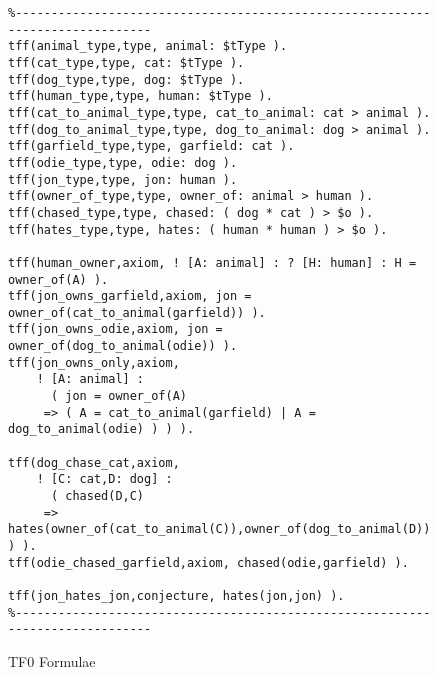 \documentclass{easychair}
\begin{document}
\begin{figure}[htbp]
\begin{small}
\begin{verbatim}
%------------------------------------------------------------------------------
tff(animal_type,type, animal: $tType ).
tff(cat_type,type, cat: $tType ).
tff(dog_type,type, dog: $tType ).
tff(human_type,type, human: $tType ).
tff(cat_to_animal_type,type, cat_to_animal: cat > animal ).
tff(dog_to_animal_type,type, dog_to_animal: dog > animal ).
tff(garfield_type,type, garfield: cat ).
tff(odie_type,type, odie: dog ).
tff(jon_type,type, jon: human ).
tff(owner_of_type,type, owner_of: animal > human ).
tff(chased_type,type, chased: ( dog * cat ) > $o ).
tff(hates_type,type, hates: ( human * human ) > $o ).

tff(human_owner,axiom, ! [A: animal] : ? [H: human] : H = owner_of(A) ).
tff(jon_owns_garfield,axiom, jon = owner_of(cat_to_animal(garfield)) ).
tff(jon_owns_odie,axiom, jon = owner_of(dog_to_animal(odie)) ).
tff(jon_owns_only,axiom,
    ! [A: animal] :
      ( jon = owner_of(A)
     => ( A = cat_to_animal(garfield) | A = dog_to_animal(odie) ) ) ).

tff(dog_chase_cat,axiom,
    ! [C: cat,D: dog] :
      ( chased(D,C)
     => hates(owner_of(cat_to_animal(C)),owner_of(dog_to_animal(D))) ) ).
tff(odie_chased_garfield,axiom, chased(odie,garfield) ).

tff(jon_hates_jon,conjecture, hates(jon,jon) ).
%------------------------------------------------------------------------------
\end{verbatim}
\end{small}
\caption{TF0 Formulae}
\label{TF0Example}
\end{figure}
\end{document}
